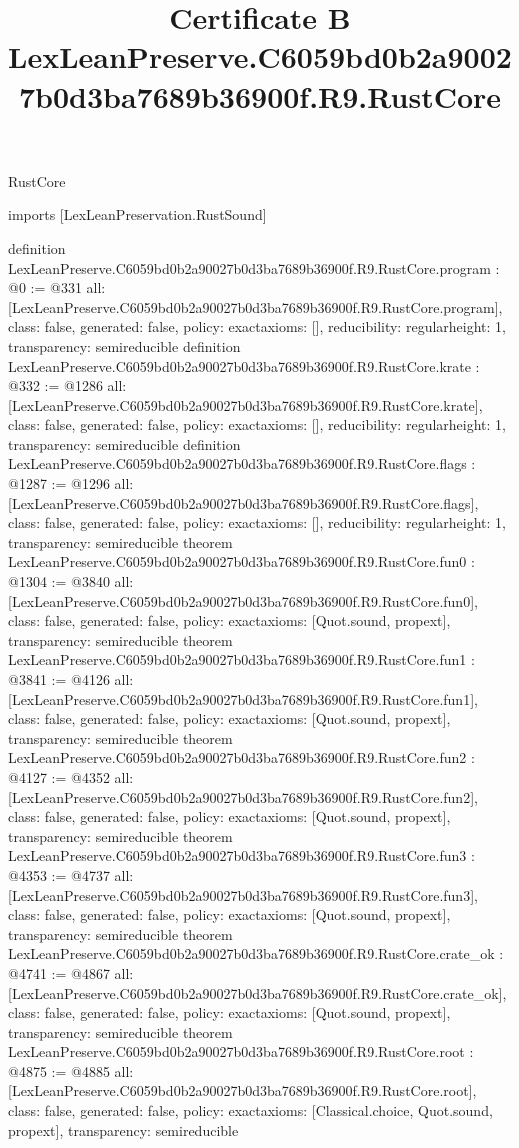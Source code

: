 \begin{lexlean}{RustCore}
\title{Certificate B LexLeanPreserve.C6059bd0b2a90027b0d3ba7689b36900f.R9.RustCore}
\begin{coremodule}
imports [LexLeanPreservation.RustSound]

definition LexLeanPreserve.C6059bd0b2a90027b0d3ba7689b36900f.R9.RustCore.program : @0 := @331 {
  all: [LexLeanPreserve.C6059bd0b2a90027b0d3ba7689b36900f.R9.RustCore.program],
  class: false,
  generated: false,
  policy: exact{axioms: []},
  reducibility: regular{height: 1},
  transparency: semireducible
}
definition LexLeanPreserve.C6059bd0b2a90027b0d3ba7689b36900f.R9.RustCore.krate : @332 := @1286 {
  all: [LexLeanPreserve.C6059bd0b2a90027b0d3ba7689b36900f.R9.RustCore.krate],
  class: false,
  generated: false,
  policy: exact{axioms: []},
  reducibility: regular{height: 1},
  transparency: semireducible
}
definition LexLeanPreserve.C6059bd0b2a90027b0d3ba7689b36900f.R9.RustCore.flags : @1287 := @1296 {
  all: [LexLeanPreserve.C6059bd0b2a90027b0d3ba7689b36900f.R9.RustCore.flags],
  class: false,
  generated: false,
  policy: exact{axioms: []},
  reducibility: regular{height: 1},
  transparency: semireducible
}
theorem LexLeanPreserve.C6059bd0b2a90027b0d3ba7689b36900f.R9.RustCore.fun0 : @1304 := @3840 {
  all: [LexLeanPreserve.C6059bd0b2a90027b0d3ba7689b36900f.R9.RustCore.fun0],
  class: false,
  generated: false,
  policy: exact{axioms: [Quot.sound, propext]},
  transparency: semireducible
}
theorem LexLeanPreserve.C6059bd0b2a90027b0d3ba7689b36900f.R9.RustCore.fun1 : @3841 := @4126 {
  all: [LexLeanPreserve.C6059bd0b2a90027b0d3ba7689b36900f.R9.RustCore.fun1],
  class: false,
  generated: false,
  policy: exact{axioms: [Quot.sound, propext]},
  transparency: semireducible
}
theorem LexLeanPreserve.C6059bd0b2a90027b0d3ba7689b36900f.R9.RustCore.fun2 : @4127 := @4352 {
  all: [LexLeanPreserve.C6059bd0b2a90027b0d3ba7689b36900f.R9.RustCore.fun2],
  class: false,
  generated: false,
  policy: exact{axioms: [Quot.sound, propext]},
  transparency: semireducible
}
theorem LexLeanPreserve.C6059bd0b2a90027b0d3ba7689b36900f.R9.RustCore.fun3 : @4353 := @4737 {
  all: [LexLeanPreserve.C6059bd0b2a90027b0d3ba7689b36900f.R9.RustCore.fun3],
  class: false,
  generated: false,
  policy: exact{axioms: [Quot.sound, propext]},
  transparency: semireducible
}
theorem LexLeanPreserve.C6059bd0b2a90027b0d3ba7689b36900f.R9.RustCore.crate_ok : @4741 := @4867 {
  all: [LexLeanPreserve.C6059bd0b2a90027b0d3ba7689b36900f.R9.RustCore.crate_ok],
  class: false,
  generated: false,
  policy: exact{axioms: [Quot.sound, propext]},
  transparency: semireducible
}
theorem LexLeanPreserve.C6059bd0b2a90027b0d3ba7689b36900f.R9.RustCore.root : @4875 := @4885 {
  all: [LexLeanPreserve.C6059bd0b2a90027b0d3ba7689b36900f.R9.RustCore.root],
  class: false,
  generated: false,
  policy: exact{axioms: [Classical.choice, Quot.sound, propext]},
  transparency: semireducible
}


\end{coremodule}
\end{lexlean}
